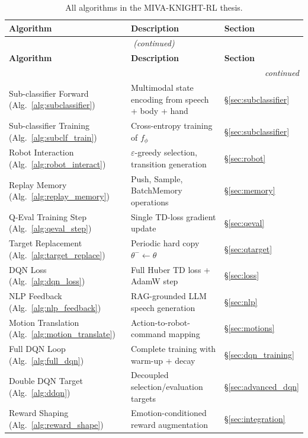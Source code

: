 \documentclass[12pt,a4paper]{article}
\theoremstyle{definition}
\theoremstyle{plain}
\theoremstyle{remark}
\begin{document}
\begin{longtable}{p{4.5cm}p{7.0cm}p{3.0cm}}
\caption{All algorithms in the MIVA-KNIGHT-RL thesis.}\label{tab:algo_ref}\\
\toprule
\textbf{Algorithm} & \textbf{Description} & \textbf{Section} \\
\midrule
\endfirsthead
\multicolumn{3}{c}{\textit{(continued)}}\\
\toprule \textbf{Algorithm} & \textbf{Description} & \textbf{Section} \\ \midrule
\endhead \midrule \multicolumn{3}{r}{\textit{continued}}\\ \endfoot \bottomrule \endlastfoot

Sub-classifier Forward (Alg.~\ref{alg:subclassifier}) & Multimodal state encoding from speech + body + hand & \S\ref{sec:subclassifier} \\[3pt]
Sub-classifier Training (Alg.~\ref{alg:subclf_train}) & Cross-entropy training of $f_\phi$ & \S\ref{sec:subclassifier} \\[3pt]
Robot Interaction (Alg.~\ref{alg:robot_interact}) & $\varepsilon$-greedy selection, transition generation & \S\ref{sec:robot} \\[3pt]
Replay Memory (Alg.~\ref{alg:replay_memory}) & Push, Sample, BatchMemory operations & \S\ref{sec:memory} \\[3pt]
Q-Eval Training Step (Alg.~\ref{alg:qeval_step}) & Single TD-loss gradient update & \S\ref{sec:qeval} \\[3pt]
Target Replacement (Alg.~\ref{alg:target_replace}) & Periodic hard copy $\theta^- \gets \theta$ & \S\ref{sec:qtarget} \\[3pt]
DQN Loss (Alg.~\ref{alg:dqn_loss}) & Full Huber TD loss + AdamW step & \S\ref{sec:loss} \\[3pt]
NLP Feedback (Alg.~\ref{alg:nlp_feedback}) & RAG-grounded LLM speech generation & \S\ref{sec:nlp} \\[3pt]
Motion Translation (Alg.~\ref{alg:motion_translate}) & Action-to-robot-command mapping & \S\ref{sec:motions} \\[3pt]
Full DQN Loop (Alg.~\ref{alg:full_dqn}) & Complete training with warm-up + decay & \S\ref{sec:dqn_training} \\[3pt]
Double DQN Target (Alg.~\ref{alg:ddqn}) & Decoupled selection/evaluation targets & \S\ref{sec:advanced_dqn} \\[3pt]
Reward Shaping (Alg.~\ref{alg:reward_shape}) & Emotion-conditioned reward augmentation & \S\ref{sec:integration} \\[3pt]
\end{longtable}
\end{document}
